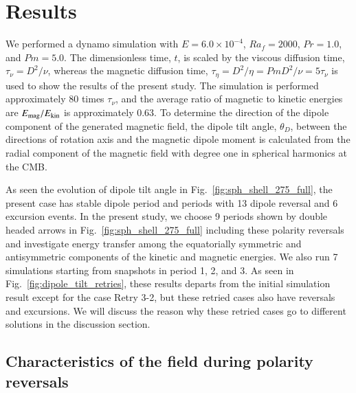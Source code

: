 \section{Results}
\label{section:results}

We performed a dynamo simulation with $E = 6.0 \times 10^{-4}$, $Ra_f = 2000$, $Pr = 1.0$, and $Pm = 5.0$. 
{\color{blue}
The dimensionless time, $t$, is scaled by the viscous diffusion time, $\tau_\nu = D^2 / \nu$, whereas the magnetic diffusion time, $\tau_\eta = D^2 / \eta = Pm D^2 / \nu = 5 \tau_\nu$ is used to show the results of the present study.
}
The simulation is performed approximately 80 times 
$\tau_\nu$,
and the average ratio of magnetic to kinetic energies are $E_{\rm mag} / E_{\rm kin}$ is approximately 0.63. 
{\color{blue}
To determine the direction of the dipole component of the generated magnetic field,  
the dipole tilt angle, $\theta_D$, between the directions of rotation axis and the magnetic dipole moment is calculated from the radial component of the magnetic field with degree one in spherical harmonics at the CMB.
}

As seen the evolution of dipole tilt angle in Fig.~\ref{fig:sph_shell_275_full}, the present case has stable dipole period and periods with 13 dipole reversal and 6 excursion events. 
In the present study, we choose 9 periods shown by double headed arrows in Fig.~\ref{fig:sph_shell_275_full} including these polarity reversals and investigate energy transfer among the equatorially symmetric and antisymmetric components of the kinetic and magnetic energies. 
We also run 7 simulations  starting from snapshots in period 1, 2, and 3. 
As seen in Fig.~\ref{fig:dipole_tilt_retries}, these results departs from the initial simulation result except for the case Retry 3-2, but these retried cases also have reversals and excursions. 
We will discuss the reason why these retried cases go to different solutions in the discussion section.

\subsection{Characteristics of the field during polarity reversals}

